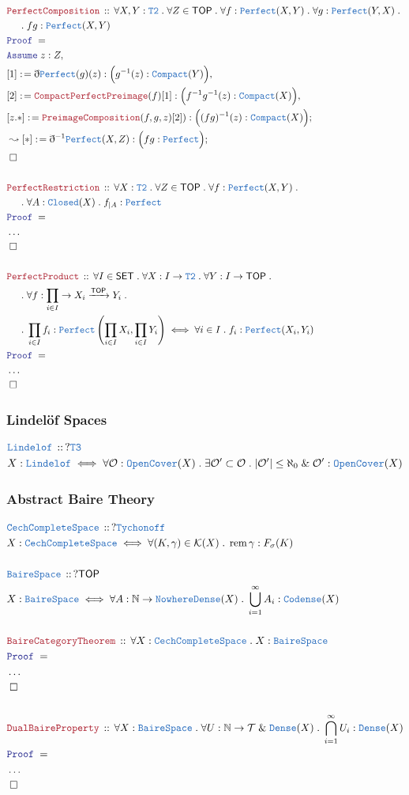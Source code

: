 \documentclass[12pt]{scrartcl}
\newcommand{\TYPE}[1]{\textcolor{NavyBlue}{\mathtt{#1}}}
\newcommand{\LOGIC}[1]{\textcolor{Blue}{\mathtt{#1}}}
\newcommand{\THM}[1]{\textcolor{Maroon}{\mathtt{#1}}}
\renewcommand{\.}{\; . \;}
\newcommand{\de}{: \kern 0.1pc =}
\newcommand{\Theorem}[2]{& \THM{#1} \, :: \, #2 \\ & \Proof = \\ }
\newcommand{\DeclareType}[2]{& \TYPE{#1} \, :: \, #2 \\}
\newcommand{\DefineType}[3]{& #1 : \TYPE{#2} \iff #3 \\}
\newcommand{\NewLine}{\\ & \kern 1pc}
\newcommand{\Page}[1]{ \begin{align*} #1 \end{align*}   }
\newcommand{ \bd }{ \ByDef }
\newcommand{\NoProof}{ & \ldots \\ \EndProof}
\renewcommand{\And}{\; \& \;}
\newcommand{\Nat}{\mathbb{N} }
\newcommand{\Arrow}{\xrightarrow}
\newcommand{\Say}[3]{& #1 \de #2 : #3, \\}
\newcommand{\Conclude}[3]{& #1 \de #2 : #3; \\}
\newcommand{\DeriveConclude}[3]{& \leadsto #1 \de #2 : #3 ; \\}
\newcommand{\Assume}[2]{& \LOGIC{Assume} \; #1 : #2, \\}
\newcommand{\QED}{\; \square}
\newcommand{\EndProof}{& \QED \\}
\newcommand{\ByDef}{\eth}
\newcommand{\Proof}{\LOGIC{Proof} \; }
\newcommand{\SET}{\mathsf{SET}}
\DeclareMathOperator{\rem}{rem}
\newcommand{\TOP}{\mathsf{TOP}}
\newcommand{\T}{\mathcal{T}}
\begin{document}
\Page{
	\Theorem{PerfectComposition}
	{
		\forall X,Y : \TYPE{T2} \.
		\forall Z \in \TOP \.
		\forall f : \TYPE{Perfect}(X,Y) \.
		\forall g : \TYPE{Perfect}(Y,X) \. \NewLine \.
		fg : \TYPE{Perfect}(X,Y) 
	}
	\Assume{z}{Z}
	\Say{[1]}{\bd \TYPE{Perfect}(g)(z)}{\Big( g^{-1}(z) : \TYPE{Compact}(Y) \Big)}
	\Say{[2]}{\THM{CompactPerfectPreimage}(f)[1]}{\Big( f^{-1}g^{-1}(z) : \TYPE{Compact}(X) \Big)}
	\Conclude{[z.*]}{\THM{PreimageComposition}(f,g,z)[2])}{\Big( (fg)^{-1}(z) : \TYPE{Compact}(X) \Big)}
	\DeriveConclude{[*]}{\bd^{-1}\TYPE{Perfect}(X,Z)}{\Big( fg : \TYPE{Perfect} \Big)}
	\EndProof
	\\
	\Theorem{PerfectRestriction}
	{
		\forall X : \TYPE{T2} \.
		\forall Z \in \TOP \.
		\forall f : \TYPE{Perfect}(X,Y) \. \NewLine \.
		\forall A : \TYPE{Closed}(X)   \.
		f_{|A} : \TYPE{Perfect}                           
	}
	\NoProof
	\\
	\Theorem{PerfectProduct}
	{
		\forall I \in \SET \.
		\forall X : I \to\TYPE{T2} \.
		\forall Y : I \to \TOP \. \NewLine \.
		\forall f : \prod_{i \in I} \to X_i \Arrow{\TOP} Y_i \. \NewLine \. 
		\prod_{i \in I} f_i : \TYPE{Perfect}\left(\prod_{i \in I} X_i, \prod_{i \in I} Y_i\right) 
		\iff
		\forall i \in I \. f_i : \TYPE{Perfect}(X_i,Y_i)
	}
	\NoProof
}
\newpage
\subsubsection{Lindel\"of Spaces}
\Page{   
	\DeclareType{Lindelof}
	{
		?\TYPE{T3}
	}
	\DefineType{X}{Lindelof}
	{
		\forall \mathcal{O} : \TYPE{OpenCover}(X) \. 
		\exists \mathcal{O}' \subset \mathcal{O} \.
		|\mathcal{O}'| \le \aleph_0 \And \mathcal{O}' : \TYPE{OpenCover}(X)
	}
}
\newpage
\subsubsection{Abstract Baire Theory}
\Page{
	\DeclareType{CechCompleteSpace}{?\TYPE{Tychonoff}}
	\DefineType{X}{CechCompleteSpace}{\forall (K,\gamma) \in \mathcal{K}(X) \. \rem \gamma : F_\sigma(K)}
	\\
	\DeclareType{BaireSpace}{?\TOP}
	\DefineType{X}{BaireSpace}{\forall A : \Nat \to \TYPE{NowhereDense}(X) \. \bigcup^\infty_{i=1} A_i : \TYPE{Codense}(X)}
	\\
	\Theorem{BaireCategoryTheorem}{\forall X : \TYPE{CechCompleteSpace} \. X : \TYPE{BaireSpace}  }
	\NoProof
	\\
	\Theorem{DualBaireProperty}{\forall X : \TYPE{BaireSpace} \. \forall U : \Nat \to \T \And \TYPE{Dense}(X) \. \bigcap^\infty_{i=1} U_i : \TYPE{Dense}(X)}
	\NoProof
}
\newpage
\end{document}
